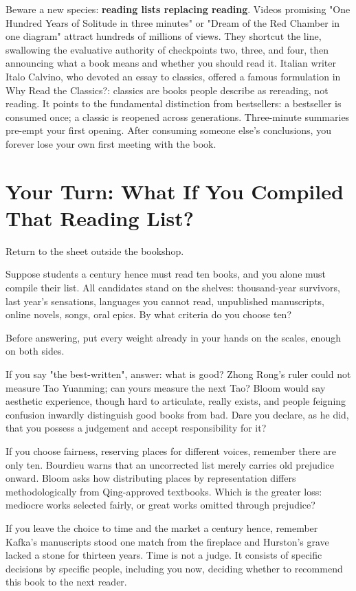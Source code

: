 Beware a new species: \textbf{reading lists replacing reading}. Videos promising "One Hundred Years of Solitude in three minutes" or "Dream of the Red Chamber in one diagram" attract hundreds of millions of views. They shortcut the line, swallowing the evaluative authority of checkpoints two, three, and four, then announcing what a book means and whether you should read it. Italian writer Italo Calvino, who devoted an essay to classics, offered a famous formulation in Why Read the Classics?: classics are books people describe as rereading, not reading. It points to the fundamental distinction from bestsellers: a bestseller is consumed once; a classic is reopened across generations. Three-minute summaries pre-empt your first opening. After consuming someone else's conclusions, you forever lose your own first meeting with the book.

\section[Your Turn: Compile the Reading List]{Your Turn: What If You Compiled That Reading List?}
Return to the sheet outside the bookshop.

Suppose students a century hence must read ten books, and you alone must compile their list. All candidates stand on the shelves: thousand-year survivors, last year's sensations, languages you cannot read, unpublished manuscripts, online novels, songs, oral epics. By what criteria do you choose ten?

Before answering, put every weight already in your hands on the scales, enough on both sides.

If you say "the best-written", answer: what is good? Zhong Rong's ruler could not measure Tao Yuanming; can yours measure the next Tao? Bloom would say aesthetic experience, though hard to articulate, really exists, and people feigning confusion inwardly distinguish good books from bad. Dare you declare, as he did, that you possess a judgement and accept responsibility for it?

If you choose fairness, reserving places for different voices, remember there are only ten. Bourdieu warns that an uncorrected list merely carries old prejudice onward. Bloom asks how distributing places by representation differs methodologically from Qing-approved textbooks. Which is the greater loss: mediocre works selected fairly, or great works omitted through prejudice?

If you leave the choice to time and the market a century hence, remember Kafka's manuscripts stood one match from the fireplace and Hurston's grave lacked a stone for thirteen years. Time is not a judge. It consists of specific decisions by specific people, including you now, deciding whether to recommend this book to the next reader.

